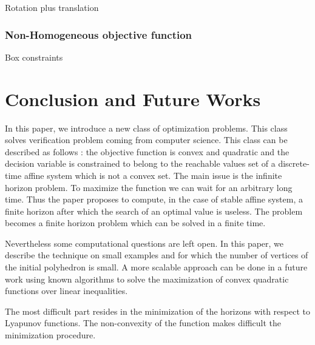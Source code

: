 \documentclass[10pt]{article}
\begin{document}
Rotation plus translation 
\subsubsection{Non-Homogeneous objective function}

Box constraints 

\section{Conclusion and Future Works}
\label{conclusion}
In this paper, we introduce a new class of optimization problems. This class solves verification problem coming from computer science. This class can be described as follows : the objective function is convex and quadratic and the decision variable is constrained to belong to the reachable values set of a discrete-time affine system which is not a convex set. The main issue is the infinite horizon problem. To maximize the function we can wait for an arbitrary long time. Thus the paper proposes to compute, in the case of stable affine system, a finite horizon after which the search of an optimal value is useless. The problem becomes a finite horizon problem which can be solved in a finite time. 

Nevertheless some computational questions are left open. In this paper, we describe the technique on small examples and for which the number of vertices of the initial polyhedron is small. A more scalable approach can be done in a future work using known algorithms to solve the maximization of convex quadratic functions over linear inequalities. 

The most  difficult part resides in the minimization of the horizons with respect to Lyapunov functions. The non-convexity of the function makes difficult the minimization procedure.         

 
\end{document}
